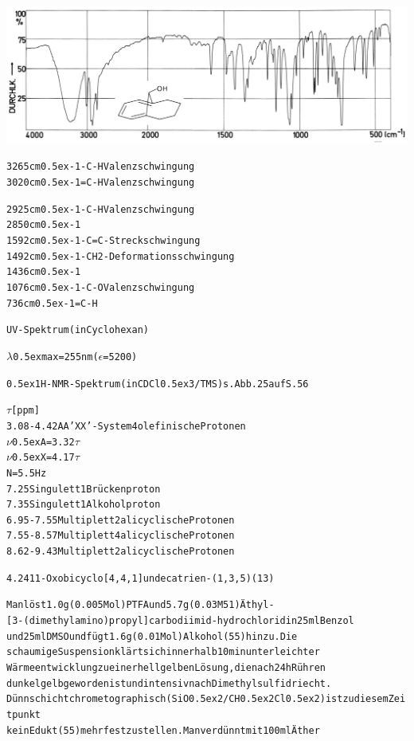 \documentclass[a4paper,11pt]{article}
\begin{document}
\hspace*{-0.5cm}\includegraphics[width=15.43cm]{IR_053}
\begin{alltt}

3265 cm\raise0.5ex\hbox{-1} -C-H Valenzschwingung
3020 cm\raise0.5ex\hbox{-1} =C-H Valenzschwingung


\newpage
{}


2925 cm\raise0.5ex\hbox{-1} -C-H Valenzschwingung
2850 cm\raise0.5ex\hbox{-1}
1592 cm\raise0.5ex\hbox{-1} -C=C- Streckschwingung
1492 cm\raise0.5ex\hbox{-1} -CH2- Deformationsschwingung
1436 cm\raise0.5ex\hbox{-1}
1076 cm\raise0.5ex\hbox{-1} -C-O Valenzschwingung
 736 cm\raise0.5ex\hbox{-1} =C-H

UV-Spektrum (in Cyclohexan)

\(\lambda\)\lower0.5ex\hbox{max} = 255 nm (\(\epsilon\) = 5200)

\leavevmode\raise0.5ex\hbox{1}H-NMR-Spektrum (in CDCl\lower0.5ex\hbox{3}/TMS) s. Abb. 25 auf S. 56

  \(\tau\) [ppm]
3.08 - 4.42   AA'XX’-System    4 olefinische Protonen
              \(\nu\)\lower0.5ex\hbox{A} = 3.32 \(\tau\)
              \(\nu\)\lower0.5ex\hbox{X} = 4.17 \(\tau\)
              N = 5.5 Hz
7.25          Singulett        1 Brückenproton
7.35          Singulett        1 Alkoholproton
6.95 - 7.55   Multiplett       2 alicyclische Protonen
7.55 - 8.57   Multiplett       4 alicyclische Protonen
8.62 - 9.43   Multiplett       2 alicyclische Protonen


4.24 11-Oxobicyclo[4‚4‚1]undecatrien-(1‚3,5) (13)

Man löst 1.0 g (0.005 Mol) PTFA und 5.7 g (0.03 M51) Äthyl-
[3-(dimethylamino)propyl]carbodiimid-hydrochlorid in 25 ml Benzol
und 25 ml DMSO und fügt 1.6 g (0.01 Mol) Alkohol (55) hinzu. Die
schaumige Suspension klärt sich innerhalb 10 min unter leichter
Wärmeentwicklung zu einer hellgelben Lösung, die nach 24 h Rühren
dunkelgelb geworden ist und intensiv nach Dimethylsulfid riecht.
Dünnschichtchrometographisch (SiO\lower0.5ex\hbox{2}/CH\lower0.5ex\hbox{2}Cl\lower0.5ex\hbox{2}) ist zu diesem Zeitpunkt
kein Edukt (55) mehr festzustellen. Man verdünnt mit 100 ml Äther



\end{alltt}
\end{document}

